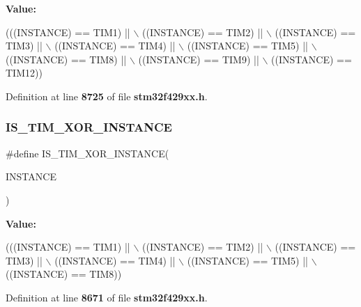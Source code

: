 {\bfseries Value\+:}
\begin{DoxyCode}
(((INSTANCE) == TIM1) || \(\backslash\)
                                         ((INSTANCE) == TIM2) || \(\backslash\)
                                         ((INSTANCE) == TIM3) || \(\backslash\)
                                         ((INSTANCE) == TIM4) || \(\backslash\)
                                         ((INSTANCE) == TIM5) || \(\backslash\)
                                         ((INSTANCE) == TIM8) || \(\backslash\)
                                         ((INSTANCE) == TIM9) || \(\backslash\)
                                         ((INSTANCE) == TIM12))
\end{DoxyCode}


Definition at line \textbf{ 8725} of file \textbf{ stm32f429xx.\+h}.

\mbox{\label{group__Exported__macros_ga6e06388143bb7bb111c78a3686dd753a}} 
\subsubsection{I\+S\+\_\+\+T\+I\+M\+\_\+\+X\+O\+R\+\_\+\+I\+N\+S\+T\+A\+N\+CE}
{\footnotesize\ttfamily \#define I\+S\+\_\+\+T\+I\+M\+\_\+\+X\+O\+R\+\_\+\+I\+N\+S\+T\+A\+N\+CE(\begin{DoxyParamCaption}\item[{}]{I\+N\+S\+T\+A\+N\+CE }\end{DoxyParamCaption})}

{\bfseries Value\+:}
\begin{DoxyCode}
(((INSTANCE) == TIM1) || \(\backslash\)
                                         ((INSTANCE) == TIM2) || \(\backslash\)
                                         ((INSTANCE) == TIM3) || \(\backslash\)
                                         ((INSTANCE) == TIM4) || \(\backslash\)
                                         ((INSTANCE) == TIM5) || \(\backslash\)
                                         ((INSTANCE) == TIM8))
\end{DoxyCode}


Definition at line \textbf{ 8671} of file \textbf{ stm32f429xx.\+h}.

\mbox{\label{group__Exported__macros_gaf9a11d0720f3efa780126414a4ac50ad}} 
